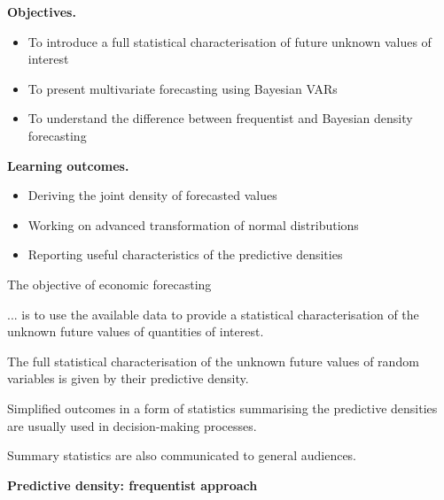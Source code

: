 \documentclass[notes,blackandwhite,mathsans,usenames,dvipsnames]{beamer}
\begin{document}
{
\begin{frame}

\bigskip\textbf{\color{mcxs1}Objectives.}
\begin{itemize}[label=$\blacktriangleright$]
\item {\color{mcxs1}To introduce a full statistical characterisation of future unknown values of interest}
\item {\color{mcxs1}To present multivariate forecasting using Bayesian VARs}
\item {\color{mcxs1}To understand the difference between frequentist and Bayesian density forecasting}
\end{itemize}

\bigskip\textbf{\color{mcxs2}Learning outcomes.}
\begin{itemize}[label=$\blacktriangleright$]
\item {\color{mcxs2}Deriving the joint density of forecasted values}
\item {\color{mcxs2}Working on advanced transformation of normal distributions}
\item {\color{mcxs2}Reporting useful characteristics of the predictive densities}
\end{itemize}

\end{frame}
}



{
\begin{frame}{The objective of economic forecasting}

... is to use the available data to provide a statistical characterisation of the unknown future values of quantities of interest.

\bigskip The full statistical characterisation of the unknown future values of random variables is given by their {\color{mcxs2}predictive density.}

\bigskip Simplified outcomes in a form of statistics summarising the predictive densities are usually used in decision-making processes.

\bigskip Summary statistics are also communicated to general audiences.

\end{frame}
}





{
\begin{frame}

\begin{adjustwidth}{-0.5cm}{0cm}
\vspace{8.3cm}\Large
\textbf{{\color{mcxs3}Predictive density:} {\color{mcxs5}frequentist approach}}
\end{adjustwidth}

\end{frame}
}
\end{document}
